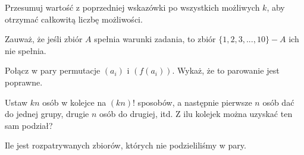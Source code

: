 

\begin{hints_list}
	\item Przesumuj wartość z poprzedniej wskazówki po wszystkich możliwych $k$, aby otrzymać całkowitą liczbę możliwości.
	\item Zauważ, że jeśli zbiór $A$ spełnia warunki zadania, to zbiór $\{1, 2, 3, ..., 10\} - A$ ich nie spełnia.
	\item *
	\item Połącz w pary permutacje $(a_i)$ i $(f(a_i))$. Wykaż, że to parowanie jest poprawne.
	\item Ustaw $kn$ osób w kolejce na $(kn)!$ sposobów, a następnie pierwsze $n$ osób dać do jednej grupy, drugie $n$ osób do drugiej, itd. Z ilu kolejek można uzyskać ten sam podział?
	\item Ile jest rozpatrywanych zbiorów, których nie podzieliliśmy w pary.
	\item *
\end{hints_list}